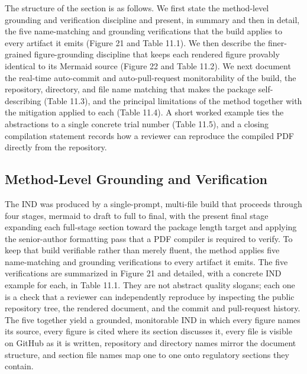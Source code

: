 The structure of the section is as follows. We first state the method-level
grounding and verification discipline and present, in summary and then in detail,
the five name-matching and grounding verifications that the build applies to every
artifact it emits (Figure 21 and Table 11.1). We then describe the finer-grained
figure-grounding discipline that keeps each rendered figure provably identical to
its Mermaid source (Figure 22 and Table 11.2). We next document the real-time
auto-commit and auto-pull-request monitorability of the build, the repository,
directory, and file name matching that makes the package self-describing (Table
11.3), and the principal limitations of the method together with the mitigation
applied to each (Table 11.4). A short worked example ties the abstractions to a
single concrete trial number (Table 11.5), and a closing compilation statement
records how a reviewer can reproduce the compiled PDF directly from the repository.

\subsection{Method-Level Grounding and Verification}

The IND was produced by a single-prompt, multi-file build that proceeds through
four stages, mermaid to draft to full to final, with the present final stage
expanding each full-stage section toward the package length target and applying the
senior-author formatting pass that a PDF compiler is required to verify. To keep
that build verifiable rather than merely fluent, the method applies five
name-matching and grounding verifications to every artifact it emits. The five
verifications are summarized in Figure 21 and detailed, with a concrete IND example
for each, in Table 11.1. They are not abstract quality slogans; each one is a check
that a reviewer can independently reproduce by inspecting the public repository
tree, the rendered document, and the commit and pull-request history. The five
together yield a grounded, monitorable IND in which every figure names its source,
every figure is cited where its section discusses it, every file is visible on
GitHub as it is written, repository and directory names mirror the document
structure, and section file names map one to one onto regulatory sections
they contain.

